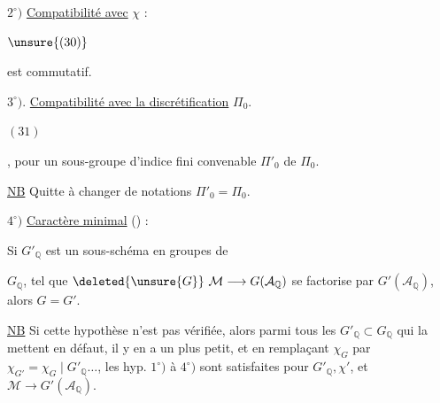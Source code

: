 \(2^\circ)\) \uline{Compatibilité avec} \(\chi\) :

\begin{samepage}
\(\unsure{(30)}\)
\end{samepage}
est commutatif.

\(3^\circ)\). \uline{Compatibilité avec la discrétification} \(\Pi_0\).

\begin{samepage}
\((31)\)
\end{samepage},
pour un sous-groupe d'indice fini convenable \(\Pi'_0\) de \(\Pi_0\).

\uline{NB} Quitte à changer de notations  \(\Pi'_0=\Pi_0\).

\(4^\circ)\) \uline{Caractère minimal} () :

Si \(G'_{\mathbb{Q}}\) est un sous-schéma en groupes de


\(G_{\mathbb{Q}}\), tel que \(\deleted{\unsure{G}}\ \mathcal{M}\longrightarrow G(\mathcal{A}_{\mathbb{Q}})\) se factorise par \(G'(\mathcal{A}_{\mathbb{Q}})\), alors \(G=G'\).

\uline{NB} Si cette hypothèse n'est pas vérifiée, alors parmi tous les \(G'_{\mathbb{Q}}\subset G_{\mathbb{Q}}\) qui la mettent en défaut, il y en a un  plus petit, et en remplaçant \(\chi_G\) par \(\chi_{G'}=\chi_G\mid G'_{\mathbb{Q}}\ldots\), les hyp. \(1^\circ)\) à \(4^\circ)\) sont satisfaites pour \(G'_{\mathbb{Q}},\chi'\), et \(\mathcal{M}\longrightarrow G'(\mathcal{A}_{\mathbb{Q}})\).

